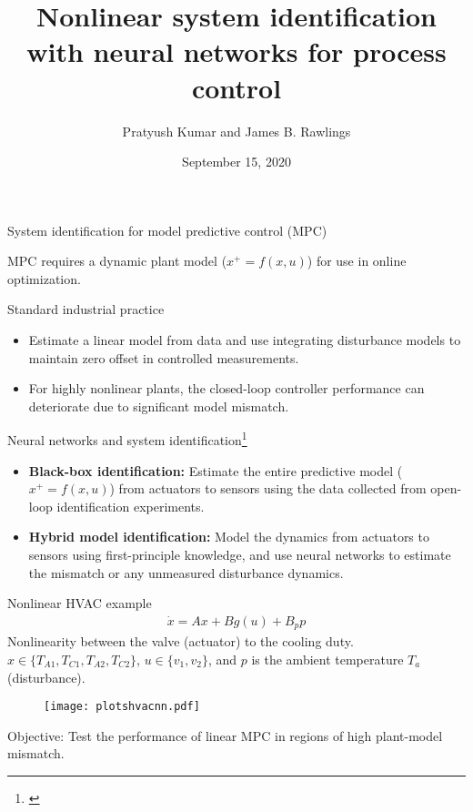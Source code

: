 \documentclass[xcolor=dvipsnames, 8pt]{beamer} %
\title[Nonlinear system identification with neural networks for 
process control]{Nonlinear system identification with neural networks for 
process control}
\date{September 15, 2020}
\author[Kumar and Rawlings]{\large Pratyush Kumar and James B. Rawlings}
\institute[UCSB]{
	\begin{minipage}{4in}
		\vspace{-10pt}
		\centering
		\raisebox{-0.1\height}{\texttt{[image: UCSB\_seal]}}
	\end{minipage}
	\vspace{10pt}
	\newline
	{\large Department of Chemical Engineering}
	\vspace{10pt}
	\newline
	{\large TWCCC Meeting (Virtual)}}
\begin{document}
\frame{\titlepage}

\begin{frame}{System identification for model predictive control (MPC)}

MPC requires a dynamic plant model ($x^+ = f(x, u)$) for use in online optimization.  

	\begin{block}{Standard industrial practice}
		\begin{itemize}
			\item Estimate a linear model from data and use integrating disturbance models to maintain zero offset 
			in controlled measurements.
			\item For highly nonlinear plants, the closed-loop controller performance can deteriorate due to significant model mismatch. 
		\end{itemize}
	\end{block}
	
	\begin{block}{Neural networks and system identification\footnote[frame]{\cite{hussain:1999, draeger:engell:ranke:1995, prasad:bequette:2003, eaton:rawlings:ungar:1994, bhat:minderman:mcavoy:wang:1990}}}
		\begin{itemize}
			\item \textbf{Black-box identification:} Estimate the entire predictive model ($x^+ =  f(x, u)$) from actuators to
			sensors using the data collected from open-loop identification experiments.
			\item \textbf{Hybrid model identification:} Model the dynamics from actuators to sensors using first-principle knowledge, and use
			neural networks to estimate the mismatch or any unmeasured disturbance dynamics.  
		\end{itemize}
	\end{block}
\end{frame}

\begin{frame}{Nonlinear HVAC example}
	\begin{align*}
	\dot{x} = Ax + Bg(u) + B_pp
	\end{align*}
	Nonlinearity between the valve (actuator) to the cooling duty. $x \in \{ T_{A1}, T_{C1}, T_{A2}, T_{C2} \}$, $u \in \{v_1, v_2\}$,
	and $p$ is the ambient temperature $T_a$ (disturbance).
	\pause
	\begin{figure}[!h]
		\centering
		\texttt{[image: plotshvacnn.pdf]}
	\end{figure}
	\alert{Objective: Test the performance of linear MPC in regions of high plant-model mismatch.}
	\end{frame}
	
\end{document}
